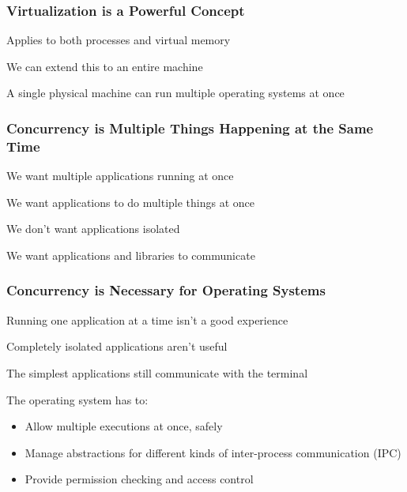   \begin{frame}
    \frametitle{Virtualization is a Powerful Concept}

    Applies to both processes and virtual memory

    \vspace{4em}

    We can extend this to an entire machine

    \vspace{2em}

    A single physical machine can run multiple operating systems at once
  \end{frame}

  \begin{frame}
    \frametitle{Concurrency is Multiple Things Happening at the Same Time}

    We want multiple applications running at once

    \vspace{2em}

    We want applications to do multiple things at once

    \vspace{4em}

    We don't want applications isolated

    \vspace{2em}

    We want applications and libraries to communicate   
  \end{frame}

  \begin{frame}
    \frametitle{Concurrency is Necessary for Operating Systems}

    Running one application at a time isn't a good experience

    \vspace{2em}

    Completely isolated applications aren't useful

    \hspace{2em} The simplest applications still communicate with the terminal

    \vspace{4em}

    The operating system has to:
    \begin{itemize}
      \item Allow multiple executions at once, safely
      \item Manage abstractions for different kinds of inter-process communication (IPC)
      \item Provide permission checking and access control
    \end{itemize}
  \end{frame}

